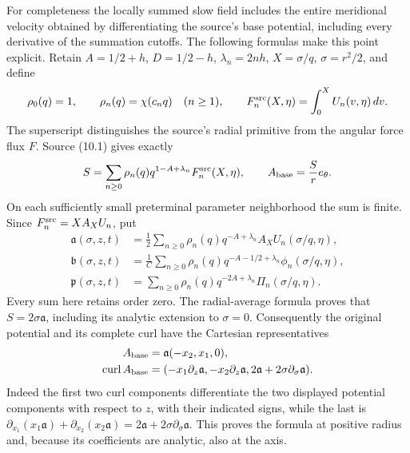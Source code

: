 For completeness the locally summed slow field includes the entire
meridional velocity obtained by differentiating the source's base
potential, including every derivative of the summation cutoffs.
The following formulas make this point explicit. Retain
$A=1/2+h$, $D=1/2-h$, $\lambda_n=2nh$, $X=\sigma/q$,
$\sigma=r^2/2$, and define
\[
 \rho_0(q)=1,\qquad \rho_n(q)=\chi(c_nq)\quad(n\geq1),
 \qquad F_n^{\rm src}(X,\eta)=\int_0^X U_n(v,\eta)\,dv .
\]
The superscript distinguishes the source's radial primitive from
the angular force flux $F$. Source (10.1) gives exactly
\[
 S=\sum_{n\geq0}\rho_n(q)q^{1-A+\lambda_n}
                         F_n^{\rm src}(X,\eta),
 \qquad A_{\rm base}=\frac Sr e_\theta .
\]
On each sufficiently small preterminal parameter neighborhood the
sum is finite. Since $F_n^{\rm src}=X A_XU_n$, put
\begin{equation}
\begin{aligned}
 \mathfrak a(\sigma,z,t)
 &=\frac12\sum_{n\geq0}\rho_n(q)q^{-A+\lambda_n}
                     A_XU_n(\sigma/q,\eta),\\
 \mathfrak b(\sigma,z,t)
 &=\frac1C\sum_{n\geq0}\rho_n(q)q^{-A-1/2+\lambda_n}
                          \phi_n(\sigma/q,\eta),\\
 \mathfrak p(\sigma,z,t)
 &=\sum_{n\geq0}\rho_n(q)q^{-2A+\lambda_n}
                          \Pi_n(\sigma/q,\eta).
\end{aligned}
 \label{eq:cq-actual-full-slow-germ-coefficients}
\end{equation}
Every sum here retains order zero. The radial-average formula proves
that $S=2\sigma\mathfrak a$, including its analytic extension to
$\sigma=0$. Consequently the original potential and its complete
curl have the Cartesian representatives
\begin{equation}
\begin{aligned}
 A_{\rm base}&=\mathfrak a(-x_2,x_1,0),\\
 \operatorname{curl} A_{\rm base}
 &=(-x_1\partial_z\mathfrak a,
    -x_2\partial_z\mathfrak a,
       2\mathfrak a+2\sigma\partial_\sigma\mathfrak a).
\end{aligned}
 \label{eq:cq-actual-full-meridional-curl}
\end{equation}
Indeed the first two curl components differentiate the two displayed
potential components with respect to $z$, with their indicated
signs, while the last is
$\partial_{x_1}(x_1\mathfrak a)+
  \partial_{x_2}(x_2\mathfrak a)
 =2\mathfrak a+2\sigma\partial_\sigma\mathfrak a$.
This proves the formula at positive radius and, because its
coefficients are analytic, also at the axis.

